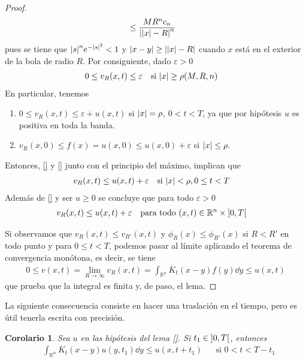 \documentclass{article}
\newcommand{\realNumbers}{\mathbb{R}}
\newtheorem{corollary}{Corolario}
\theoremstyle{definition}
\theoremstyle{remark}
\newcommand{\leftOpenInterval}{\left]}
\newcommand{\rightOpenInterval}{\right[}
\newcommand{\leftClosedInterval}{\left[}
\newcommand{\rightClosedInterval}{\right]}
\newcommand{\interval}[3]{%
  \ifstrequal{#1}{oo}{%
    \leftOpenInterval #2, #3 \rightOpenInterval%
  }{%
    \ifstrequal{#1}{co}{%
      \leftClosedInterval #2, #3 \rightOpenInterval%
    }{%
      \ifstrequal{#1}{oc}{
        \leftOpenInterval #2, #3 \rightClosedInterval%
      }{%
        \ifstrequal{#1}{cc}{
          \leftClosedInterval #2, #3 \rightClosedInterval
        }{%
        }%
      }%
    }%
  }%
}
\begin{document}
\begin{proof}
\begin{align}
      &\leq
      \frac{M R^n c_n}{\abs{\abs{x} - R}^n}
    \end{align}
    pues se tiene que \(\abs{s}^n e^{- \abs{s}^2} < 1\) y \(\abs{x - y} \geq \abs{\abs{x} - R}\) cuando \(x\) está en el exterior de la bola de radio \(R\).
    Por consiguiente, dado \(\varepsilon > 0\)
    \begin{align}
      & 0 \leq v_R(x, t) \leq \varepsilon
      && \text{si } \abs{x} \geq \rho(M, R, n)
    \end{align}
    En particular, tenemos
    \begin{enumerate}
      \item \(0 \leq v_R(x, t) \leq \varepsilon + u(x, t)\) si \(\abs{x} = \rho\), \(0 < t < T\), ya que por hipótesis \(u\) es positiva en toda la banda.
      \item \(v_R(x, 0) \leq f(x) = u(x, 0) \leq u(x, 0) + \varepsilon\) si \(\abs{x} \leq \rho\).
    \end{enumerate}
    Entonces, \ref{} %
    y \ref{} %
    junto con el principio del máximo, implican que
    \begin{align}
      & v_R(x, t) \leq u(x, t) + \varepsilon
      && \text{si } \abs{x} < \rho, 0 \leq t < T
    \end{align}
    Además de \ref{}  %
    y ser \(u \geq 0\) se concluye que para todo \(\varepsilon > 0\)
    \begin{align}
      &v_R(x, t) \leq u(x, t) + \varepsilon
      && \text{para todo } (x, t) \in \realNumbers^n \times \interval{oo}{0}{T}
    \end{align}
    
    Si observamos que \(v_R(x, t) \leq v_{R'}(x, t)\) y \(\phi_R(x) \leq \phi_{R'}(x)\) si \(R < R'\) en todo punto y para \(0 \leq t < T\), podemos pasar al límite aplicando el teorema de convergencia monótona, es decir, se tiene
    \begin{align}
      0
      \leq
      v(x, t)
      =
      \lim_{R \rightarrow \infty} v_R(x, t)
      =
      \int_{\realNumbers^n} K_t(x - y) f(y) \dd y
      \leq
      u(x, t)
    \end{align}
    que prueba que la integral es finita y, de paso, el lema.
  \end{proof}

  La siguiente consecuencia consiste en hacer una traslación en el tiempo, pero es útil tenerla escrita con precisión.

  \begin{corollary}
    Sea \(u\) en las hipótesis del lema \ref{}.  %
    Si \(t_1 \in \interval{oo}{0}{T}\), entonces
    \begin{align}
      &\int_{\realNumbers^n} K_t(x - y) u(y, t_1) \dd y
      \leq
      u(x, t + t_1)
      && \text{si } 0 < t < T - t_1
    \end{align}
  \end{corollary}
\end{document}
